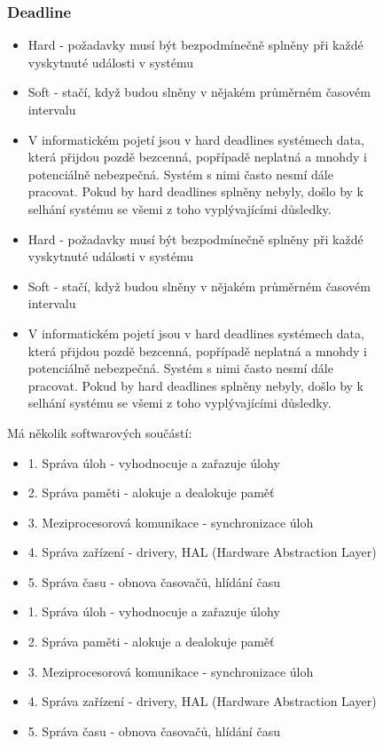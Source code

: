\begin{figure}[h]
\subsubsection*{Deadline}
\begin{itemize}
  \item Hard - požadavky musí být bezpodmínečně splněny při každé vyskytnuté události v systému
  \item Soft - stačí, když budou slněny v nějakém průměrném časovém intervalu
  \item V informatickém pojetí jsou v hard deadlines systémech data, která přijdou pozdě bezcenná, popřípadě neplatná a mnohdy i potenciálně nebezpečná. Systém s nimi často nesmí dále pracovat. Pokud by hard deadlines splněny nebyly, došlo by k selhání systému se všemi z toho vyplývajícími důsledky.
    \item Hard - požadavky musí být bezpodmínečně splněny při každé vyskytnuté události v systému
    \item Soft - stačí, když budou slněny v nějakém průměrném časovém intervalu
    \item V informatickém pojetí jsou v hard deadlines systémech data, která přijdou pozdě bezcenná, popřípadě neplatná a mnohdy i potenciálně nebezpečná. Systém s nimi často nesmí dále pracovat. Pokud by hard deadlines splněny nebyly, došlo by k selhání systému se všemi z toho vyplývajícími důsledky.
\end{itemize}
Má několik softwarových součástí:
\begin{itemize}
  \item 1. Správa úloh - vyhodnocuje a zařazuje úlohy
  \item 2. Správa paměti - alokuje a dealokuje paměť 
  \item 3. Meziprocesorová komunikace - synchronizace úloh
  \item 4. Správa zařízení - drivery, HAL (Hardware Abstraction Layer)
  \item 5. Správa času - obnova časovačů, hlídání času
    \item 1. Správa úloh - vyhodnocuje a zařazuje úlohy
    \item 2. Správa paměti - alokuje a dealokuje paměť
    \item 3. Meziprocesorová komunikace - synchronizace úloh
    \item 4. Správa zařízení - drivery, HAL (Hardware Abstraction Layer)
    \item 5. Správa času - obnova časovačů, hlídání času
\end{itemize}


\end{figure}

